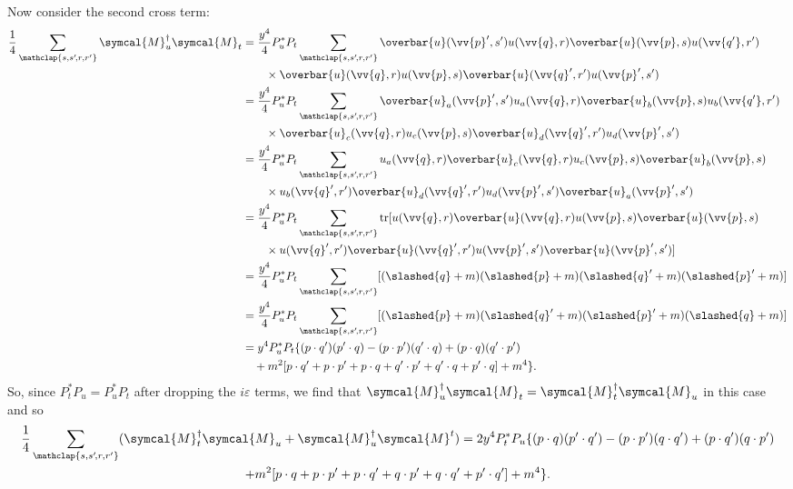 \documentclass[fleqn]{NotesClass}
\newcommand{\hermit}{{\dagger}}
\newcommand{\amplitude}{\symcal{M}}
\DeclareMathOperator{\tr}{tr}
\newcommand{\diracadjoint}[1]{\overbar{#1}}
\begin{document}
    Now consider the second cross term:
    \begin{align}
        \frac{1}{4}\sum_{\mathclap{s, s'\!, r, r'}} \amplitude_u^\hermit \amplitude_t &= \frac{y^4}{4} P_u^*P_t \sum_{\mathclap{s, s'\!, r, r'}} \diracadjoint{u}(\vv{p}', s') u(\vv{q}, r) \diracadjoint{u}(\vv{p}, s) u(\vv{q'}, r') \notag\\
        &\qquad \times \diracadjoint{u}(\vv{q}, r) u(\vv{p}, s) \diracadjoint{u}(\vv{q}', r') u(\vv{p}', s')\\
        &= \frac{y^4}{4} P_u^*P_t \sum_{\mathclap{s, s'\!, r, r'}} \diracadjoint{u}_a(\vv{p}', s') u_a(\vv{q}, r) \diracadjoint{u}_b(\vv{p}, s) u_b(\vv{q'}, r') \notag\\
        &\qquad \times \diracadjoint{u}_c(\vv{q}, r) u_c(\vv{p}, s) \diracadjoint{u}_d(\vv{q}', r') u_d(\vv{p}', s')\\
        &= \frac{y^4}{4} P_u^*P_t \sum_{\mathclap{s, s'\!, r, r'}} u_a(\vv{q}, r) \diracadjoint{u}_c(\vv{q}, r) u_c(\vv{p}, s) \diracadjoint{u}_b(\vv{p}, s) \notag\\
        &\qquad \times u_b(\vv{q}', r') \diracadjoint{u}_d(\vv{q}', r') u_d(\vv{p}', s') \diracadjoint{u}_a(\vv{p}', s')\\
        &= \frac{y^4}{4} P_u^*P_t \sum_{\mathclap{s, s'\!, r, r'}} \tr[u(\vv{q}, r) \diracadjoint{u}(\vv{q}, r) u(\vv{p}, s) \diracadjoint{u}(\vv{p}, s) \notag\\
        &\qquad \times u(\vv{q}', r') \diracadjoint{u}(\vv{q}', r') u(\vv{p}', s') \diracadjoint{u}(\vv{p}', s')]\\
        &= \frac{y^4}{4} P_u^*P_t \sum_{\mathclap{s, s'\!, r, r'}}[(\slashed{q} + m)(\slashed{p} + m)(\slashed{q}' + m)(\slashed{p}' + m)]\\
        &= \frac{y^4}{4} P_u^*P_t \sum_{\mathclap{s, s'\!, r, r'}}[(\slashed{p} + m)(\slashed{q}' + m)(\slashed{p}' + m)(\slashed{q} + m)]\\
        &= y^4 P_u^*P_t \{(p \cdot q')(p' \cdot q) - (p \cdot p')(q' \cdot q) + (p \cdot q)(q' \cdot p')\\
        &\quad + m^2[p \cdot q' + p \cdot p' + p \cdot q + q' \cdot p' + q' \cdot q + p' \cdot q] + m^4\}.\notag
    \end{align}
    So, since \(P_t^*P_u = P_u^*P_t\) after dropping the \(i\varepsilon\) terms, we find that \(\amplitude_u^\hermit \amplitude_t = \amplitude_t^\hermit \amplitude_u\) in this case and so
    \begin{multline}
        \frac{1}{4}\sum_{\mathclap{s, s'\!, r, r'}} (\amplitude_t^\hermit \amplitude_u + \amplitude_u^\hermit \amplitude^t) = 2y^4 P_t^*P_u \{(p \cdot q)(p' \cdot q') - (p \cdot p')(q \cdot q') + (p \cdot q')(q \cdot p')\\
        + m^2[p \cdot q + p \cdot p' + p \cdot q' + q \cdot p' + q \cdot q' + p' \cdot q'] + m^4\}.
    \end{multline}
    
\end{document}
